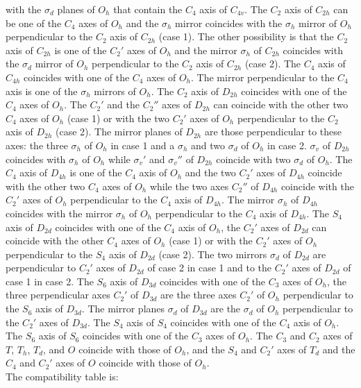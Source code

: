 \documentclass[12pt,a4paper,twoside]{report}
\begin{document}
with the $\sigma_d$ planes of $O_h$ that contain the $C_4$ axis of $C_{4v}$.
The $C_2$ axis of $C_{2h}$ can be one of the $C_4$ axes of $O_h$ and
the $\sigma_h$ mirror coincides with the $\sigma_h$ mirror of $O_h$ 
perpendicular to the $C_2$ axis of $C_{2h}$ (case 1).
The other possibility is that the $C_2$ axis of $C_{2h}$ is one of 
the $C_2'$ axes of $O_h$ and the mirror $\sigma_h$ of $C_{2h}$ coincides with
the $\sigma_d$ mirror of $O_h$ perpendicular to the $C_2$ axis of $C_{2h}$
(case 2). The $C_4$ axis of $C_{4h}$ coincides with one of the
$C_4$ axes of $O_h$. The mirror perpendicular to the $C_4$ axis is one of
the $\sigma_h$ mirrors of $O_h$. 
The $C_2$ axis of $D_{2h}$ coincides with one of the $C_4$ axes of $O_h$. 
The $C_2'$ and the $C_2''$ axes of $D_{2h}$ can coincide with the other two 
$C_4$ axes of $O_h$ (case 1) or with the two $C_2'$ axes of $O_h$
perpendicular to the $C_2$ axis of $D_{2h}$ (case 2). The mirror planes of 
$D_{2h}$ are those 
perpendicular to these axes: the three $\sigma_h$ of $O_h$ in case 1 and a
$\sigma_h$ and two $\sigma_d$ of $O_h$ in case 2. $\sigma_v$ of $D_{2h}$
coincides with $\sigma_h$ of $O_h$ while $\sigma_v'$ and $\sigma_v''$
of $D_{2h}$ coincide with two $\sigma_d$ of $O_h$.
The $C_4$ axis of $D_{4h}$ is
one of the $C_4$ axis of $O_h$ and the two $C_2'$ axes of $D_{4h}$ coincide 
with the other two $C_4$ axes of $O_h$ while the two axes $C_2''$ of $D_{4h}$ 
coincide with the $C_2'$ axes of $O_h$ perpendicular to the $C_4$ axis of 
$D_{4h}$.
The mirror $\sigma_h$ of $D_{4h}$ coincides with the mirror $\sigma_h$ of
$O_h$ perpendicular to the $C_4$ axis of $D_{4h}$.
The $S_4$ axis of $D_{2d}$ coincides with one of the $C_4$ axis of $O_h$,
the $C_2'$ axes of $D_{2d}$ can coincide with the other $C_4$ axes of 
$O_h$ (case 1) or with the $C_2'$ axes of $O_h$ perpendicular to the $S_4$ 
axis of $D_{2d}$ (case 2). The two mirrors $\sigma_d$ of $D_{2d}$ are 
perpendicular to $C_2'$ axes of $D_{2d}$ of case 2 in case 1 and to the $C_2'$
axes of $D_{2d}$ of case 1 in case 2.
The $S_6$ axis of $D_{3d}$ coincides with one of the $C_3$ axes
of $O_h$, the three perpendicular axes $C_2'$ of $D_{3d}$ are the three axes 
$C_2'$ of $O_h$ perpendicular to the $S_6$ axis of $D_{3d}$. The mirror planes 
$\sigma_d$ of $D_{3d}$ are the $\sigma_d$ of $O_h$ perpendicular to the $C_2'$ 
axes of $D_{3d}$.
The $S_4$ axis of $S_4$ coincides with one of the $C_4$ axis of $O_h$. 
The $S_6$ axis of $S_6$ coincides with one of the $C_3$ axes of $O_h$. 
The $C_3$ and $C_2$ axes of $T$, $T_h$, $T_d$, and
$O$ coincide with those of $O_h$, and the $S_4$ and $C_2'$ axes of $T_d$ and
the $C_4$ and $C_2'$ axes of $O$ coincide with those of $O_h$. \\
The compatibility table is:
\end{document}
